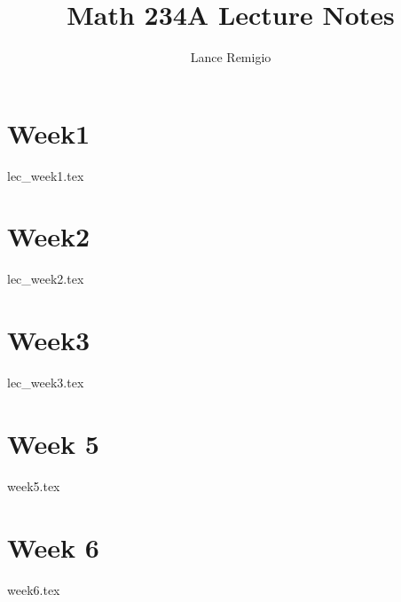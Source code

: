 \documentclass[a4paper]{report}
\title{Math 234A Lecture Notes}
\author{Lance Remigio}
\begin{document}
\maketitle    
\tableofcontents

\chapter{Week1}

{lec_week1.tex}

\chapter{Week2}

{lec_week2.tex}

\chapter{Week3}

{lec_week3.tex}

\chapter{Week 5}

{week5.tex}

\chapter{Week 6}

{week6.tex}
\end{document}
